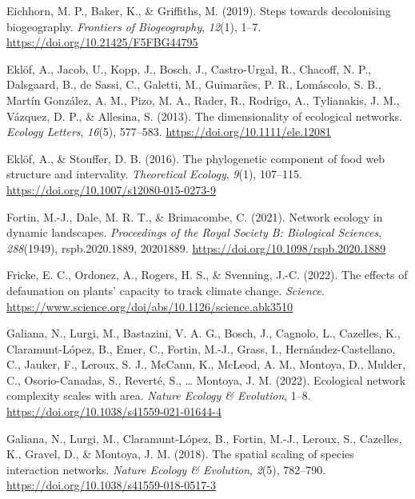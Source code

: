 \documentclass[11pt]{article}
\newlength{\cslhangindent}
\newenvironment{CSLReferences}[2] %
 {%
  \setlength{\parindent}{0pt}
  \ifodd #1 \everypar{\setlength{\hangindent}{\cslhangindent}}\ignorespaces\fi
  \ifnum #2 > 0
  \setlength{\parskip}{#2\baselineskip}
  \fi
 }%
 {}
\begin{document}
\begin{CSLReferences}{1}{0}
\leavevmode{}%
Eichhorn, M. P., Baker, K., \& Griffiths, M. (2019). Steps towards
decolonising biogeography. \emph{Frontiers of Biogeography},
\emph{12}(1), 1--7. \url{https://doi.org/10.21425/F5FBG44795}

\leavevmode{}%
Eklöf, A., Jacob, U., Kopp, J., Bosch, J., Castro-Urgal, R., Chacoff, N.
P., Dalsgaard, B., de Sassi, C., Galetti, M., Guimarães, P. R.,
Lomáscolo, S. B., Martín González, A. M., Pizo, M. A., Rader, R.,
Rodrigo, A., Tylianakis, J. M., Vázquez, D. P., \& Allesina, S. (2013).
The dimensionality of ecological networks. \emph{Ecology Letters},
\emph{16}(5), 577--583. \url{https://doi.org/10.1111/ele.12081}

\leavevmode{}%
Eklöf, A., \& Stouffer, D. B. (2016). The phylogenetic component of food
web structure and intervality. \emph{Theoretical Ecology}, \emph{9}(1),
107--115. \url{https://doi.org/10.1007/s12080-015-0273-9}

\leavevmode{}%
Fortin, M.-J., Dale, M. R. T., \& Brimacombe, C. (2021). Network ecology
in dynamic landscapes. \emph{Proceedings of the Royal Society B:
Biological Sciences}, \emph{288}(1949), rspb.2020.1889, 20201889.
\url{https://doi.org/10.1098/rspb.2020.1889}

\leavevmode{}%
Fricke, E. C., Ordonez, A., Rogers, H. S., \& Svenning, J.-C. (2022).
The effects of defaunation on plants' capacity to track climate change.
\emph{Science}.
\url{https://www.science.org/doi/abs/10.1126/science.abk3510}

\leavevmode{}%
Galiana, N., Lurgi, M., Bastazini, V. A. G., Bosch, J., Cagnolo, L.,
Cazelles, K., Claramunt-López, B., Emer, C., Fortin, M.-J., Grass, I.,
Hernández-Castellano, C., Jauker, F., Leroux, S. J., McCann, K., McLeod,
A. M., Montoya, D., Mulder, C., Osorio-Canadas, S., Reverté, S.,
\ldots{} Montoya, J. M. (2022). Ecological network complexity scales
with area. \emph{Nature Ecology \& Evolution}, 1--8.
\url{https://doi.org/10.1038/s41559-021-01644-4}

\leavevmode{}%
Galiana, N., Lurgi, M., Claramunt-López, B., Fortin, M.-J., Leroux, S.,
Cazelles, K., Gravel, D., \& Montoya, J. M. (2018). The spatial scaling
of species interaction networks. \emph{Nature Ecology \& Evolution},
\emph{2}(5), 782--790. \url{https://doi.org/10.1038/s41559-018-0517-3}


\end{CSLReferences}
\end{document}
